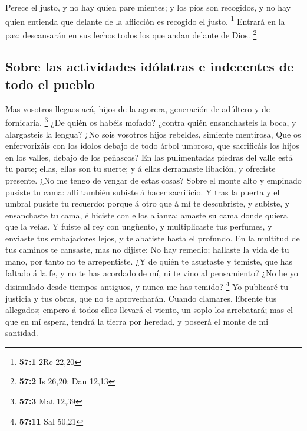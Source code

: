  Perece el justo, y no hay quien pare mientes; y los píos
son recogidos, y no hay quien entienda que delante de la aflicción es
recogido el justo. \footnote{\textbf{57:1} 2Re 22,20} 
Entrará en la paz; descansarán en sus lechos todos los que andan delante
de Dios. \footnote{\textbf{57:2} Is 26,20; Dan 12,13}

\hypertarget{sobre-las-actividades-iduxf3latras-e-indecentes-de-todo-el-pueblo}{%
\subsection{Sobre las actividades idólatras e indecentes de todo el
pueblo}\label{sobre-las-actividades-iduxf3latras-e-indecentes-de-todo-el-pueblo}}

 Mas vosotros llegaos acá, hijos de la agorera, generación
de adúltero y de fornicaria. \footnote{\textbf{57:3} Mat 12,39}
 ¿De quién os habéis mofado? ¿contra quién ensanchasteis
la boca, y alargasteis la lengua? ¿No sois vosotros hijos rebeldes,
simiente mentirosa,  Que os enfervorizáis con los ídolos
debajo de todo árbol umbroso, que sacrificáis los hijos en los valles,
debajo de los peñascos?  En las pulimentadas piedras del
valle está tu parte; ellas, ellas son tu suerte; y á ellas derramaste
libación, y ofreciste presente. ¿No me tengo de vengar de estas cosas?
 Sobre el monte alto y empinado pusiste tu cama: allí
también subiste á hacer sacrificio.  Y tras la puerta y el
umbral pusiste tu recuerdo: porque á otro que á mí te descubriste, y
subiste, y ensanchaste tu cama, é hiciste con ellos alianza: amaste su
cama donde quiera que la veías.  Y fuiste al rey con
ungüento, y multiplicaste tus perfumes, y enviaste tus embajadores
lejos, y te abatiste hasta el profundo.  En la multitud
de tus caminos te cansaste, mas no dijiste: No hay remedio; hallaste la
vida de tu mano, por tanto no te arrepentiste.  ¿Y de
quién te asustaste y temiste, que has faltado á la fe, y no te has
acordado de mí, ni te vino al pensamiento? ¿No he yo disimulado desde
tiempos antiguos, y nunca me has temido? \footnote{\textbf{57:11} Sal
  50,21}  Yo publicaré tu justicia y tus obras, que no te
aprovecharán.  Cuando clamares, líbrente tus allegados;
empero á todos ellos llevará el viento, un soplo los arrebatará; mas el
que en mí espera, tendrá la tierra por heredad, y poseerá el monte de mi
santidad.

